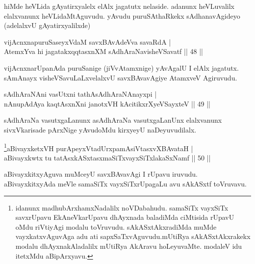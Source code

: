 \begin{artha} 
hiMde heVLida gAyatirxyalelx elAlx jagatutx nelaside. adanunx 
heVLuvalilx elalxvanunx heVLidaMtAguvudu. yAvudu puruSAthaRkekx 
sAdhanavAgideyo (adelalxvU gAyatirxyalilxde)
\end{artha}


\begin{shl}
vijAcnxnapuruSaseyxVdaM savxBAvAdeVva savaRdA | \\
AtemxYva hi jagatakxqqtasxnXM sAdhAraNavisheVSavatf \hfill ||  48 ||
\end{shl}

\begin{artha} 
vijAcnxnarUpanAda puruSanige (jiVvAtamxnige) yAvAgalU I elAlx 
jagatutx. sAmAnayx visheVSavuLaLxvelalxvU savxBAvavAgiye AtamxveV 
Agiruvudu.
\end{artha}


\begin{shl}
sAdhAraNAni vasUtxni tathA\s sAdhAraNAnayxpi | \\
nAnupAdAya kaqtAsxnXni janotxVH kAcitikxrXyeVSayxteV \hfill ||  49 || 
\end{shl}

\begin{artha} 
sAdhAraNa vasutxgaLanunx asAdhAraNa vasutxgaLanUnx elalxvanunx 
sivxVkarisade pArxNige yAvudoMdu kirxyeyU naDeyuvudilalx.
\end{artha}



\begin{shl}
\footnote{idanunx madhubArxhamxNadalilx noVDabahudu. samaSiTx vayxSiTx savxrUpavu EkAneVkarUpavu dhAyxnada baladiMda ciMtisida rUpavU oMdu riVtiyAgi modalu toVruvudu. sAkASxtAkxradiMda muMde vayxkatxvAguvAga adu ati sapxSaTxvAguvudu.\break mUtiRya sAkASxtAkxrakekx modalu dhAyxnakAladalilx mUtiRya AkAravu hoLeyuvaMte. modaleV idu itetxMdu aBipArxyavu.}aBivayxketxVH purA\s peyxVtadUrxpamAsiVtasxvXBAvataH | \\
aBivayxkwtx tu tatAsxkASxtasxmaSiTxvayxSiTxlakaSxNamf \hfill ||  50 || 
\end{shl}

\begin{artha} 
aBivayxkitxyAguva muMceyU savxBAvavAgi I rUpavu iruvudu. 
aBivayxkitxyAda meVle samaSiTx vayxSiTxrUpagaLu avu sAkASxtf 
toVruvavu.
\end{artha}

